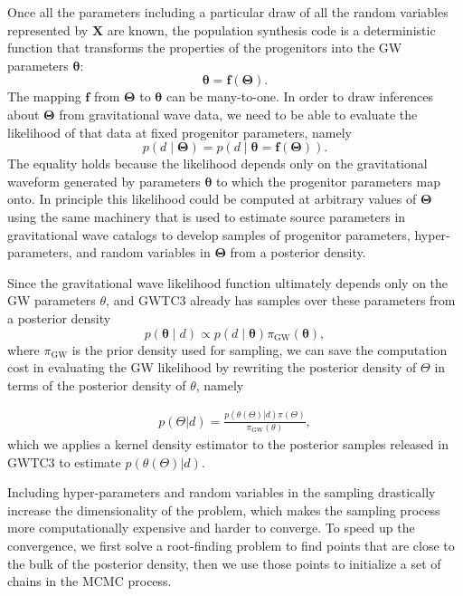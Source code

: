 \documentclass[twocolumn]{aastex631}
\begin{document}
Once all the parameters including a particular draw of all the random variables
represented by $\bm{X}$ are known, the population synthesis code is a
deterministic function that transforms the properties of the progenitors into
the GW parameters $\bm{\theta}$:
\begin{equation}
    \bm{\theta} = \bm{f}\left( \bm{\Theta} \right).
\end{equation}
The mapping $\bm{f}$ from $\bm{\Theta}$ to $\bm{\theta}$ can be many-to-one.  
In order to draw inferences about $\bm{\Theta}$ from gravitational wave data, we
need to be able to evaluate the likelihood of that data at fixed progenitor
parameters, namely
\begin{equation}
    p\left( d \mid \bm{\Theta} \right) = p\left( d \mid \bm{\theta} = \bm{f}\left( \bm{\Theta} \right) \right).
\end{equation}
The equality holds because the likelihood depends only on the gravitational waveform generated by
parameters $\bm{\theta}$ to which the progenitor parameters map onto.  In principle
this likelihood could be computed at arbitrary values of $\bm{\Theta}$ using the
same machinery that is used to estimate source parameters in gravitational wave
catalogs \citep{Veitch2015,Ashton2019,Romero-Shaw2020,GWTC-3} to develop samples
of progenitor parameters, hyper-parameters, and random variables in
$\bm{\Theta}$ from a posterior density.

Since the gravitational wave likelihood function
ultimately depends only on the GW parameters $\theta$, and GWTC3 already has samples over these parameters from a posterior density 
\begin{equation}
    p\left( \bm{\theta} \mid d \right) \propto p\left( d \mid \bm{\theta} \right) \pi_\mathrm{GW} \left( \bm{\theta} \right),
\end{equation}
where $\pi_\mathrm{GW}$ is the prior density used for sampling,
we can save the computation cost in evaluating the GW likelihood by rewriting the posterior density of $\Theta$ in terms of the posterior density of $\theta$, namely

\begin{align}
    p(\Theta | d) = \frac{p(\theta(\Theta)| d) \pi(\Theta)}{\pi_\mathrm{GW}(\theta)},
\end{align}
which we applies a kernel density estimator to the posterior samples released in GWTC3 to estimate $p(\theta(\Theta)|d)$.

Including hyper-parameters and random variables in the sampling drastically increase the dimensionality of the problem,
which makes the sampling process more computationally expensive and harder to converge.
To speed up the convergence, we first solve a root-finding problem to find points that are close to the bulk of the posterior density,
then we use those points to initialize a set of chains in the MCMC process.
\end{document}
